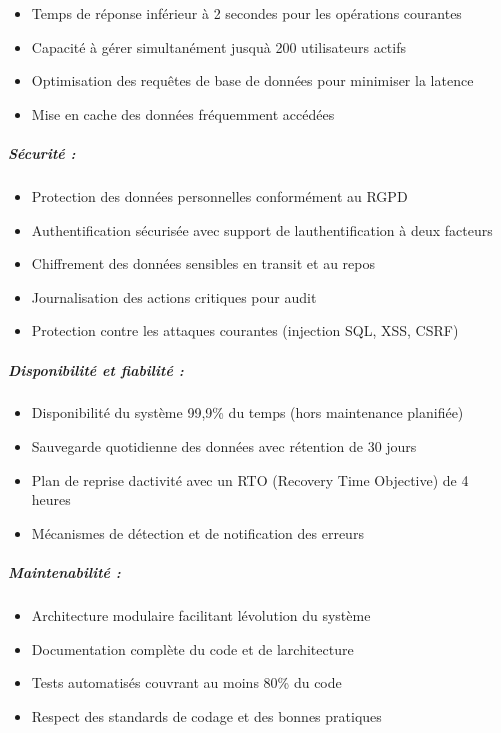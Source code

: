 \documentclass[12pt,a4paper,twoside,openright]{report}
\begin{document}
\begin{itemize}
\item
  Temps de réponse inférieur à 2 secondes pour les opérations courantes
\item
  Capacité à gérer simultanément jusqu\textquotesingle à 200
  utilisateurs actifs
\item
  Optimisation des requêtes de base de données pour minimiser la latence
\item
  Mise en cache des données fréquemment accédées
\end{itemize}

\hypertarget{suxe9curituxe9}{%
\subparagraph{Sécurité :}\label{suxe9curituxe9}}

\begin{itemize}
\item
  Protection des données personnelles conformément au RGPD
\item
  Authentification sécurisée avec support de
  l\textquotesingle authentification à deux facteurs
\item
  Chiffrement des données sensibles en transit et au repos
\item
  Journalisation des actions critiques pour audit
\item
  Protection contre les attaques courantes (injection SQL, XSS, CSRF)
\end{itemize}

\hypertarget{disponibilituxe9-et-fiabilituxe9}{%
\subparagraph{Disponibilité et fiabilité
:}\label{disponibilituxe9-et-fiabilituxe9}}

\begin{itemize}
\item
  Disponibilité du système 99,9\% du temps (hors maintenance planifiée)
\item
  Sauvegarde quotidienne des données avec rétention de 30 jours
\item
  Plan de reprise d\textquotesingle activité avec un RTO (Recovery Time
  Objective) de 4 heures
\item
  Mécanismes de détection et de notification des erreurs
\end{itemize}

\hypertarget{maintenabilituxe9}{%
\subparagraph{Maintenabilité :}\label{maintenabilituxe9}}

\begin{itemize}
\item
  Architecture modulaire facilitant l\textquotesingle évolution du
  système
\item
  Documentation complète du code et de l\textquotesingle architecture
\item
  Tests automatisés couvrant au moins 80\% du code
\item
  Respect des standards de codage et des bonnes pratiques
\end{itemize}
\end{document}
